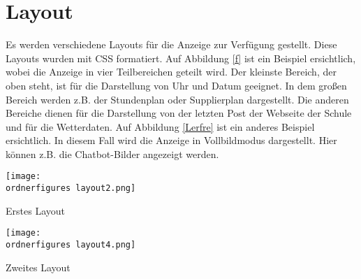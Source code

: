 \section{Layout}
Es werden verschiedene Layouts f\"ur die Anzeige zur Verf\"ugung gestellt. Diese Layouts wurden mit CSS formatiert. Auf Abbildung \ref{f} ist ein Beispiel ersichtlich, wobei die Anzeige in vier Teilbereichen geteilt wird. Der kleinste Bereich, der oben steht, ist f\"ur die Darstellung von Uhr und Datum geeignet. In dem gro\ss{}en Bereich werden z.B. der Stundenplan oder Supplierplan dargestellt. Die anderen Bereiche dienen f\"ur die Darstellung von der letzten Post der Webseite der Schule und f\"ur die Wetterdaten.
Auf Abbildung \ref{Lerfre} ist ein anderes Beispiel ersichtlich. In diesem Fall wird die Anzeige in Vollbildmodus dargestellt. Hier k\"onnen z.B. die Chatbot-Bilder angezeigt werden.
\begin{center}
	\captionsetup{type=figure}
	\texttt{[image: \\ordnerfigures layout2.png]}
	\caption{Erstes Layout}
	\label{f} 
\end{center}
\begin{center}
	\captionsetup{type=figure}
	\texttt{[image: \\ordnerfigures layout4.png]}
	\caption{Zweites Layout}
	\label{Lerfre} 
\end{center}
